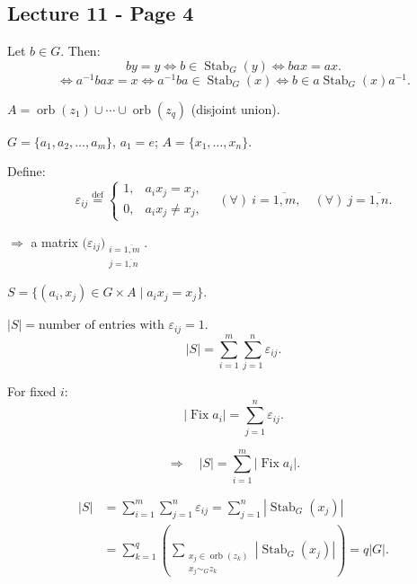 
\subsection*{Lecture 11 - Page 4}

\noindent Let $b\in G$. Then:
\[
by=y\iff b\in\operatorname{Stab}_G(y)
\iff bax=ax.
\]
\[
\iff a^{-1}bax=x
\iff a^{-1}ba\in\operatorname{Stab}_G(x)
\iff b\in a\operatorname{Stab}_G(x)a^{-1}.
\]

\bigskip
\noindent $A=\operatorname{orb}(z_1)\cup\cdots\cup
\operatorname{orb}(z_q)$ \quad (disjoint union).

\bigskip
\noindent $G=\{a_1,a_2,\ldots,a_m\}$, \quad $a_1=e$;
\qquad $A=\{x_1,\ldots,x_n\}$.

\medskip
\noindent Define:
\[
\varepsilon_{ij}\overset{\mathrm{def}}{=}
\begin{cases}
1, & a_i x_j=x_j,\\
0, & a_i x_j\neq x_j,
\end{cases}
\quad (\forall)\ i=\overline{1,m},\quad
(\forall)\ j=\overline{1,n}.
\]

\noindent $\Rightarrow$ a matrix
$\bigl(\varepsilon_{ij}\bigr)_{\substack{i=\overline{1,m}\\j=\overline{1,n}}}$.

\bigskip
\noindent $S=\{(a_i,x_j)\in G\times A\mid a_i x_j=x_j\}$.

\noindent $|S|=\text{number of entries with }\varepsilon_{ij}=1$.
\[
|S|=\sum_{i=1}^{m}\sum_{j=1}^{n}\varepsilon_{ij}.
\]

\noindent For fixed $i$:
\[
|\operatorname{Fix}a_i|=\sum_{j=1}^{n}\varepsilon_{ij}.
\]

\[
\Rightarrow\quad |S|=\sum_{i=1}^{m}|\operatorname{Fix}a_i|.
\]

\[
\begin{aligned}
|S|
&=\sum_{i=1}^{m}\sum_{j=1}^{n}\varepsilon_{ij}
 =\sum_{j=1}^{n}|\operatorname{Stab}_G(x_j)|\\[3pt]
&=\sum_{k=1}^{q}\left(
\sum_{\substack{x_j\in\operatorname{orb}(z_k)\\x_j\sim_G z_k}}
|\operatorname{Stab}_G(x_j)|\right)
 =q|G|.
\end{aligned}
\]

